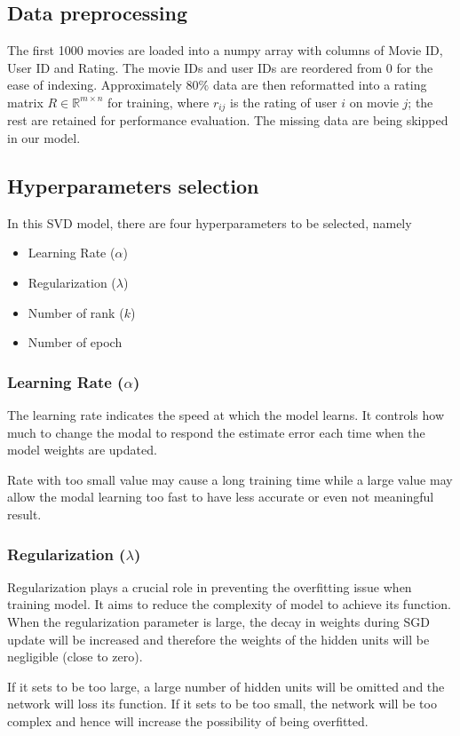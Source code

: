 \documentclass[final]{cvpr}
\begin{document}
\subsection{Data preprocessing}
The first 1000 movies are loaded into a numpy array with columns of Movie ID, User ID and Rating.
The movie IDs and user IDs are reordered from 0 for the ease of indexing.
Approximately $80\%$ data are then reformatted into a rating matrix $R \in \mathbb R^{m \times n}$ for training,
where $r_{ij}$ is the rating of user $i$ on movie $j$;
the rest are retained for performance evaluation.
The missing data are being skipped in our model.

\subsection{Hyperparameters selection}
In this SVD model, there are four hyperparameters to be selected, namely
\begin{itemize}
	\item Learning Rate ($\alpha$)
	\item Regularization ($\lambda$)
	\item Number of rank ($k$)
	\item Number of epoch
\end{itemize}

\subsubsection{Learning Rate ($\alpha$)}
The learning rate indicates the speed at which the model learns. It controls how much to change the modal to respond the estimate error each time when the model weights are updated.

Rate with too small value may cause a long training time while a large value may allow the modal learning too fast to have less accurate or even not meaningful result.

\subsubsection{Regularization ($\lambda$)}
Regularization plays a crucial role in preventing the overfitting issue when training model. It aims to reduce the complexity of model to achieve its function. When the regularization parameter is large, the decay in weights during SGD update will be increased and therefore the weights of the hidden units will be negligible (close to zero).

If it sets to be too large, a large number of hidden units will be omitted and the network will loss its function. If it sets to be too small, the network will be too complex and hence will increase the possibility of being overfitted.
\end{document}
